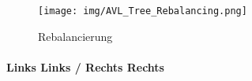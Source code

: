 \begin{figure}
    \centering
    \texttt{[image: img/AVL\_Tree\_Rebalancing.png]}
    \caption{Rebalancierung}
    \label{fig:AVL-Cases}
\end{figure}




\paragraph{Links Links / Rechts Rechts}
